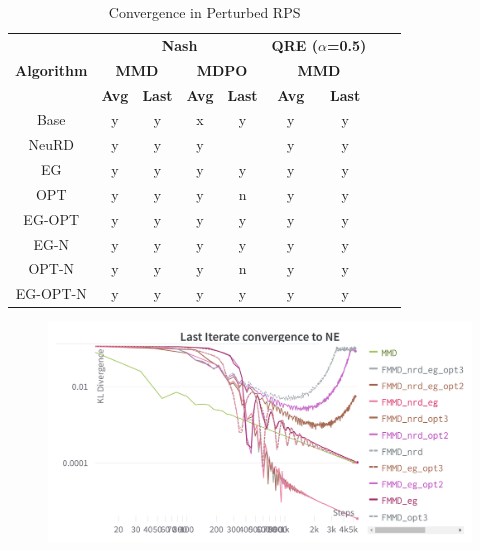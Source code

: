 
\begin{table}[htbp]
	\centering
	\begin{tabular}{|c|c|c|c|c|c|c|c|c|}
	\hline
	\multirow{3}{*}{\textbf{Algorithm}} &
	\multicolumn{4}{c|}{\textbf{Nash}} &
	\multicolumn{2}{c|}{\textbf{QRE ($\alpha$=0.5)}} \\
	\cline{2-7}
	& 
	\multicolumn{2}{c|}{\textbf{MMD}} & 
	\multicolumn{2}{c|}{\textbf{MDPO}} &
	\multicolumn{2}{c|}{\textbf{MMD}} \\
	\cline{2-7}
	& \textbf{Avg} & \textbf{Last} & \textbf{Avg} & \textbf{Last}
	& \textbf{Avg} & \textbf{Last} \\
	\hline
	Base	 	& y & y & x & y 		& y & y \\
	\hline
	NeuRD 		& y & y & y & \red{x} 	& y & y \\
	\hline
	EG 			& y & y & y & y 	& y & y \\
	\hline
	OPT 		& y & y & y & n 	& y & y \\
	\hline
	EG-OPT 		& y & y & y & y 	& y & y \\
	\hline
	EG-N 		& y & y & y & y 	& y & y \\
	\hline
	OPT-N 		& y & y & y & n 	& y & y \\
	\hline
	EG-OPT-N	& y & y & y & y 	& y & y \\
	\hline
	\end{tabular}
	\caption{Convergence in Perturbed RPS}
	\label{tab:tabular}
\end{table}

\begin{figure}[H]
\end{figure}


\begin{figure}[H]
	\includegraphics[width=15cm]{plots/MMD_NE.png}
\end{figure}

